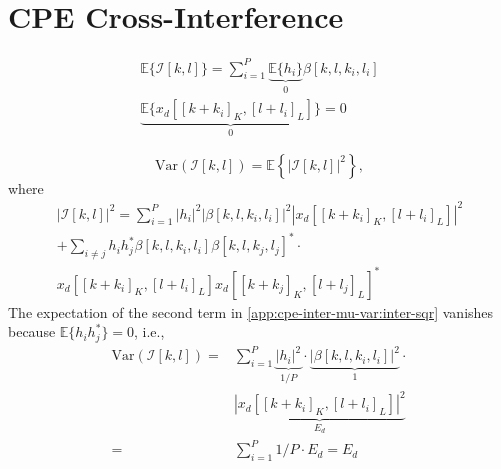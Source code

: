 \documentclass[journal]{IEEEtran}
\begin{document}
\appendices
\section{CPE Cross-Interference} \label{app:cpe-inter-mu-var}
\begin{multline}
\mathbb{E}\{\mathcal{I}[k, l]\} = \sum_{i=1}^P \underbrace{\mathbb{E}\{h_i\}}_{0} \beta[k, l, k_i, l_i] \\
\underbrace{\mathbb{E}\{x_d[[k+k_i]_K, [l+l_i]_L]\}}_{0} = 0
\end{multline}

\begin{equation}
\text{Var}(\mathcal{I}[k, l]) = \mathbb{E}\left\{ |\mathcal{I}[k, l]|^2 \right\},
\end{equation}
where
\begin{multline}
|\mathcal{I}[k, l]|^2 = \sum_{i=1}^P |h_i|^2 |\beta[k, l, k_i, l_i]|^2
|x_d[[k+k_i]_K, [l+l_i]_L]|^2 \\
+ \sum_{i \neq j} h_ih_j^*\beta[k, l, k_i, l_i]\beta[k, l, k_j, l_j]^*\cdot \\
x_d[[k+k_i]_K, [l+l_i]_L]x_d[[k+k_j]_K, [l+l_j]_L]^*
\label{app:cpe-inter-mu-var:inter-sqr}
\end{multline}
The expectation of the second term in \eqref{app:cpe-inter-mu-var:inter-sqr} vanishes because $\mathbb{E}\{h_i h_j^*\} = 0$, i.e.,
\begin{equation}
\begin{split}
\text{Var}(\mathcal{I}[k, l]) =& \sum_{i=1}^P \underbrace{|h_i|^2}_{1/P} \cdot \underbrace{|\beta[k, l, k_i, l_i]|^2}_{1} \cdot \\
&\underbrace{|x_d[[k+k_i]_K, [l+l_i]_L]|^2}_{E_d}\\
=& \sum_{i=1}^P 1/P\cdot E_d = E_d
\end{split}
\end{equation}
\end{document}
